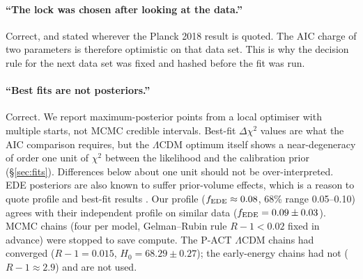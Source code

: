 \documentclass[11pt]{article}
\begin{document}
\paragraph{``The lock was chosen after looking at the data.''} Correct, and stated wherever
the Planck 2018 result is quoted. The AIC charge of two parameters is therefore optimistic
on that data set. This is why the decision rule for the next data set was fixed and hashed
before the fit was run.

\paragraph{``Best fits are not posteriors.''} Correct. We report maximum-posterior points
from a local optimiser with multiple starts, not MCMC credible intervals. Best-fit
$\Delta\chi^2$ values are what the AIC comparison requires, but the $\Lambda$CDM optimum
itself shows a near-degeneracy of order one unit of $\chi^2$ between the likelihood and the
calibration prior (\S\ref{sec:fits}). Differences below about one unit should not be
over-interpreted. EDE posteriors are also known to suffer prior-volume effects, which is a
reason to quote profile and best-fit results \cite{poulin2025}. Our profile ($f_{\rm EDE}\approx0.08$, 68\% range
0.05--0.10) agrees with their independent profile on similar data ($f_{\rm EDE}=0.09\pm0.03$). MCMC chains (four per
model, Gelman--Rubin rule $R-1<0.02$ fixed in advance) were stopped to save compute. The P-ACT $\Lambda$CDM chains had
converged ($R-1=0.015$, $H_0=68.29\pm0.27$); the early-energy chains had not ($R-1\approx2.9$) and are not used.
\end{document}
